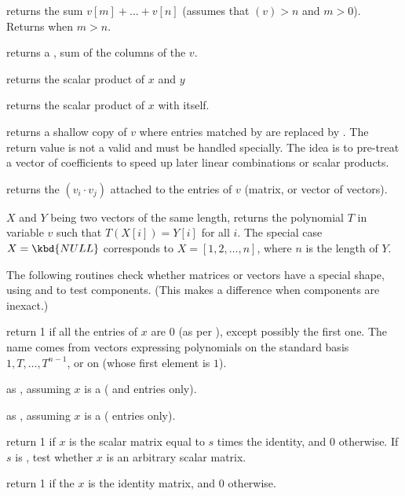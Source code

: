  returns the sum $v[m] + \dots +
v[n]$ (assumes that $(v) > n$ and $m > 0$). Returns 
when $m > n$.

 returns a , sum of the columns of the
 $v$.

 returns the scalar product of $x$ and $y$

 returns the scalar product of $x$ with itself.

 returns a shallow copy of $v$ where entries
matched by  are replaced by . The return value
is not a valid  and must be handled specially. The idea is
to pre-treat a vector of coefficients to speed up later linear combinations
or scalar products.

 returns the  $(v_i\cdot v_j)$
attached to the entries of $v$ (matrix, or vector of vectors).

 $X$ and $Y$ being two vectors of
the same length, returns the polynomial $T$ in variable $v$ such that
$T(X[i]) = Y[i]$ for all $i$. The special case $X = \kbd{NULL}$
corresponds to $X = [1,2,\dots,n]$, where $n$ is the length of $Y$.


The following routines check whether matrices or vectors have a special
shape, using  and  to test components. (This makes
a difference when components are inexact.)

 return 1 if all the entries of $x$ are $0$
(as per ), except possibly the first one. The name comes from
vectors expressing polynomials on the standard basis $1,T,\dots, T^{n-1}$, or
on  (whose first element is $1$).

 as , assuming $x$ is a
 ( and  entries only).

 as , assuming $x$ is a
 ( entries only).

 return 1 if $x$ is the scalar matrix
equal to $s$ times the identity, and 0 otherwise. If $s$ is , test
whether $x$ is an arbitrary scalar matrix.

 return 1 if the  $x$ is the
identity matrix, and 0 otherwise.

